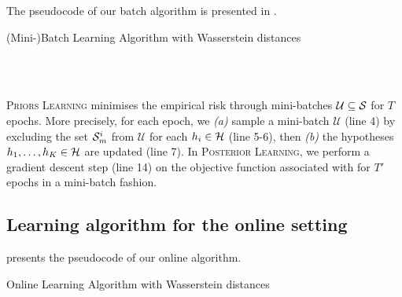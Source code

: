 \begin{noaddcontents}
    The pseudocode of our batch algorithm is presented in .
    
    \begin{algorithm}[H]
    \caption{(Mini-)Batch Learning Algorithm with Wasserstein distances}\label{alg:batch}
    \begin{algorithmic}[1]
    \\
    \EndProcedure
    \newline
    \\
    \EndProcedure
    \end{algorithmic}
    \end{algorithm}
    
    \textsc{Priors Learning} minimises the empirical risk through mini-batches $\mathcal{U}\subseteq\S$ for $T$ epochs. More precisely, for each epoch, we {\it (a)} sample a mini-batch $\mathcal{U}$ (line 4) by excluding the set $\Sm^{i}$ from $\mathcal{U}$ for each $h_i\in\H$ (line 5-6), then {\it (b)} the hypotheses $h_1,\dots,h_K\in\H$ are updated (line 7).
    In \textsc{Posterior Learning}, we perform a gradient descent step (line 14) on the objective function associated with  for $T'$ epochs in a mini-batch fashion.
    
    \subsection{Learning algorithm for the online setting}
    \label{sec:alg-online}
    
     presents the pseudocode of our online algorithm.
    
    \begin{algorithm}[H]
    \caption{Online Learning Algorithm with Wasserstein distances}\label{alg:online}
    \begin{algorithmic}[1]
    \\
    \end{algorithmic}
    \end{algorithm}
    

\end{noaddcontents}
